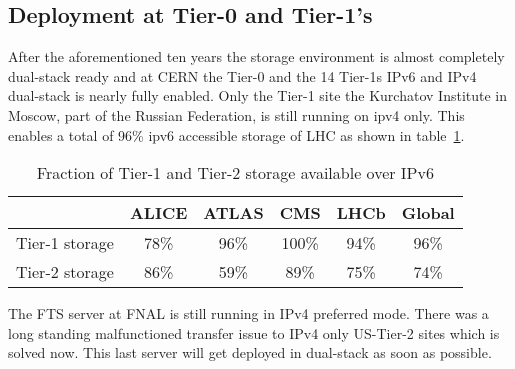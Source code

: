 
%
\subsection{Deployment at Tier-0 and Tier-1's}
After the aforementioned ten years the storage environment is almost completely dual-stack ready and at CERN the Tier-0 and the 14 Tier-1s IPv6 and IPv4 dual-stack is nearly fully enabled. Only the Tier-1 site the Kurchatov Institute in Moscow, part of the Russian Federation, is still running on ipv4 only. This enables a total of 96\% ipv6 accessible storage of LHC as shown in table~\ref{tab:t012stor}.
\begin{table}[h]
\centering
\caption{Fraction of Tier-1 and Tier-2 storage available over IPv6}
\label{tab:t012stor}
\begin{tabular}{lccccc}
\hline
& ALICE & ATLAS & CMS & LHCb & Global \\\hline
Tier-1 storage & 78\% & 96\% & 100\% & 94\% & 96\% \\
Tier-2 storage & 86\% & 59\% &  89\% & 75\% & 74\% \\\hline
\end{tabular}
\end{table}
The FTS server at FNAL is still running in IPv4 preferred mode. There was a long standing malfunctioned transfer issue to IPv4 only US-Tier-2 sites which is solved now. This last server will get deployed in dual-stack as soon as possible.
